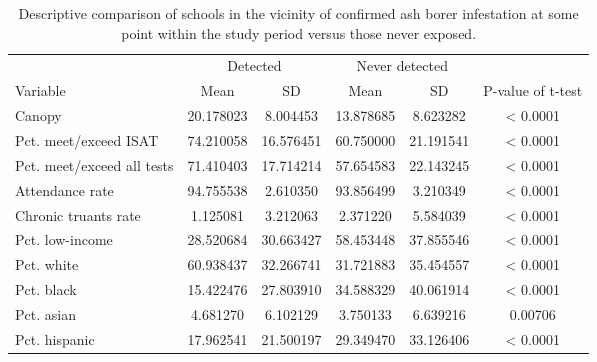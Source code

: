 \begin{table}[!h]

\caption{\label{tab:descriptive-table}Descriptive comparison of schools in the vicinity of confirmed ash borer infestation at some point within the study period versus those never exposed.}
\centering
\begin{tabular}[t]{lccccc}
\toprule
\multicolumn{1}{c}{ } & \multicolumn{2}{c}{Detected} & \multicolumn{2}{c}{Never detected} & \multicolumn{1}{c}{ } \\
\cmidrule(l{3pt}r{3pt}){2-3} \cmidrule(l{3pt}r{3pt}){4-5}
Variable & Mean & SD & Mean & SD & P-value of t-test\\
\midrule
Canopy & 20.178023 & 8.004453 & 13.878685 & 8.623282 & < 0.0001\\
Pct. meet/exceed ISAT & 74.210058 & 16.576451 & 60.750000 & 21.191541 & < 0.0001\\
Pct. meet/exceed all tests & 71.410403 & 17.714214 & 57.654583 & 22.143245 & < 0.0001\\
Attendance rate & 94.755538 & 2.610350 & 93.856499 & 3.210349 & < 0.0001\\
Chronic truants rate & 1.125081 & 3.212063 & 2.371220 & 5.584039 & < 0.0001\\
\addlinespace
Pct. low-income & 28.520684 & 30.663427 & 58.453448 & 37.855546 & < 0.0001\\
Pct. white & 60.938437 & 32.266741 & 31.721883 & 35.454557 & < 0.0001\\
Pct. black & 15.422476 & 27.803910 & 34.588329 & 40.061914 & < 0.0001\\
Pct. asian & 4.681270 & 6.102129 & 3.750133 & 6.639216 & 0.00706\\
Pct. hispanic & 17.962541 & 21.500197 & 29.349470 & 33.126406 & < 0.0001\\
\bottomrule
\end{tabular}
\end{table}

